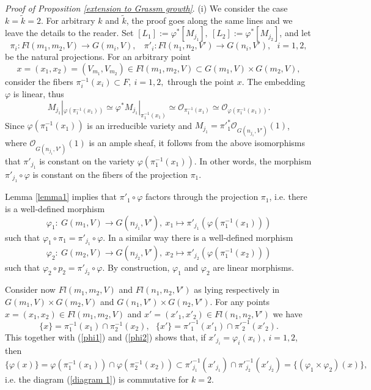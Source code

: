 \documentclass[12pt]{amsart}
\renewcommand{\phi}{\varphi}
\theoremstyle{definition}
\begin{document}
\textit{Proof of Proposition \ref{extension to Grassm growth}}.
(i) We consider the case $k=\tilde{k}=2$. For 
arbitrary $k$ and $\tilde{k}$, the proof goes along the same lines
and we leave the details to the reader. 
Set $[L_1]:=\phi^*[M_{j_1}],\ [L_2]:=\phi^*[M_{j_2}]$, and let 
$$
\pi_i:Fl(m_1,m_2,V)\to G(m_i,V),\ \ \ \ \pi'_i:Fl(n_1,n_2,V')\to 
G(n_i,V'),\ \ \ i=1,2,
$$ 
be the natural projections. For an arbitrary point 
$$
x=(x_1,x_2)=(V_{m_1},V_{m_2})\in Fl(m_1,m_2,V)\subset G(m_1,V)
\times G(m_2,V),
$$ 
consider the fibers $\pi_i^{-1}(x_i)\subset F,\ i=1,2,$ 
through the point $x$. The embedding $\varphi$ is linear, thus
$$
M_{j_1}|_{\varphi(\pi_1^{-1}(x_1))}\simeq\varphi^*M_{j_1}|_{\pi_1^
{-1}(x_1)}\simeq\mathcal{O}_{\pi_1^{-1}(x_1)}\simeq\mathcal{O}_{
\varphi(\pi_1^{-1}(x_1))}.
$$ 
Since $\varphi(\pi_1^{-1}(x_1))$ is an irreducible variety and 
$M_{j_1}={\pi'}_1^*\mathcal{O}_{G(n_{j_1},V')}(1)$, where 
$\mathcal{O}_{G(n_{j_1},V')}(1)$ is an ample sheaf, it follows 
from the above isomorphisms that $\pi'_{j_1}$ is constant on the 
variety $\varphi(\pi_1^{-1}(x_1))$. In other words, the morphism
$\pi'_{j_1}\circ\varphi$ is constant on the fibers of the projection
$\pi_1$.

Lemma \ref{lemma1} implies that $\pi'_1\circ\varphi$ 
factors through the projection $\pi_1$, i.e. there is a 
well-defined morphism 
\begin{equation}\label{phi1}
\varphi_1:\ G(m_1,V)\to G(n_{j_1},V'),\ 
x_1\mapsto \pi'_{j_1}(\varphi(\pi_1^{-1}(x_1)))
\end{equation}
such that $\varphi_1\circ \pi_1=\pi'_{j_1}\circ
\varphi$. In a similar way there is a well-defined
morphism
\begin{equation}\label{phi2}
\varphi_2:\ G(m_2,V)\to G(n_{j_2},V'),\ 
x_2\mapsto \pi'_{j_2}(\varphi(\pi_1^{-1}(x_2)))
\end{equation}
such that $\varphi_2\circ p_2=\pi'_{j_2}\circ
\varphi$. By construction, $\phi_1$ and $\phi_2$ are linear 
morphisms.  

Consider now $Fl(m_1,m_2,V)$ and $Fl(n_1,n_2,V')$ as lying
respectively in $G(m_1,V)\times G(m_2,V)$ and 
$G(n_1,V')\times G(n_2,V')$. For any points $x=(x_1,x_2)\in 
Fl(m_1,m_2,V)$ and $x'=(x'_1,x'_2)\in Fl(n_1,n_2,V')$ we have
$$
\{x\}=\pi_1^{-1}(x_1)\cap \pi_2^{-1}(x_2),\ \ \ 
\{x'\}={\pi'}_1^{-1}(x'_1)\cap {\pi'}_2^{-1}(x'_2).
$$ 
This together with (\ref{phi1}) and (\ref{phi2}) shows 
that, if $x'_{j_i}=\varphi_i(x_i),\ i=1,2$, then
$$
\{\varphi(x)\}=\varphi(\pi_1^{-1}(x_1))\cap\varphi(\pi_2^{-1}(x_2
))\subset{\pi'}_{j_1}^{-1}(x'_{j_1})\cap{\pi'}_{j_2}^{-1}(x'_{
j_2})=\{(\phi_1\times\phi_2)(x)\},
$$
i.e. the diagram (\ref{diagram 1}) is commutative for $k=2$. 
\end{document}
